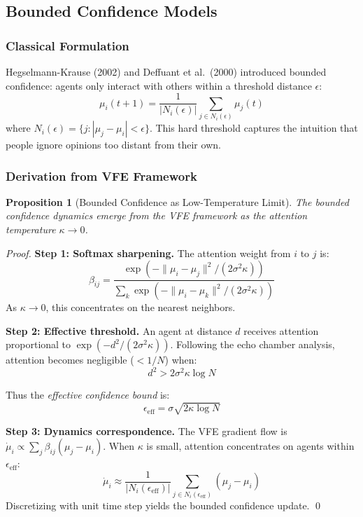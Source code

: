 \documentclass[12pt]{article}
\newtheorem{proposition}[theorem]{Proposition}
\begin{document}
\subsection{Bounded Confidence Models}

\subsubsection{Classical Formulation}

Hegselmann-Krause (2002) and Deffuant et al.\ (2000) introduced bounded confidence: 
agents only interact with others within a threshold distance $\epsilon$:
\begin{equation}
\mu_i(t+1) = \frac{1}{|N_i(\epsilon)|}\sum_{j \in N_i(\epsilon)} \mu_j(t)
\end{equation}
where $N_i(\epsilon) = \{j : |\mu_j - \mu_i| < \epsilon\}$. This hard threshold 
captures the intuition that people ignore opinions too distant from their own.

\subsubsection{Derivation from VFE Framework}

\begin{proposition}[Bounded Confidence as Low-Temperature Limit]
The bounded confidence dynamics emerge from the VFE framework as the attention 
temperature $\kappa \to 0$.
\end{proposition}

\begin{proof}
\textbf{Step 1: Softmax sharpening.}
The attention weight from $i$ to $j$ is:
\begin{equation}
\beta_{ij} = \frac{\exp(-\|\mu_i - \mu_j\|^2 / (2\sigma^2 \kappa))}
{\sum_k \exp(-\|\mu_i - \mu_k\|^2 / (2\sigma^2 \kappa))}
\end{equation}
As $\kappa \to 0$, this concentrates on the nearest neighbors.

\textbf{Step 2: Effective threshold.}
An agent at distance $d$ receives attention proportional to 
$\exp(-d^2/(2\sigma^2\kappa))$. Following the echo chamber analysis, attention 
becomes negligible ($< 1/N$) when:
\begin{equation}
d^2 > 2\sigma^2\kappa\log N
\end{equation}

Thus the \emph{effective confidence bound} is:
\begin{equation}
\boxed{\epsilon_{\text{eff}} = \sigma\sqrt{2\kappa \log N}}
\end{equation}

\textbf{Step 3: Dynamics correspondence.}
The VFE gradient flow is $\dot{\mu}_i \propto \sum_j \beta_{ij}(\mu_j - \mu_i)$.
When $\kappa$ is small, attention concentrates on agents within $\epsilon_{\text{eff}}$:
\begin{equation}
\dot{\mu}_i \approx \frac{1}{|N_i(\epsilon_{\text{eff}})|}\sum_{j \in N_i(\epsilon_{\text{eff}})} (\mu_j - \mu_i)
\end{equation}
Discretizing with unit time step yields the bounded confidence update. \qed
\end{proof}
\end{document}
